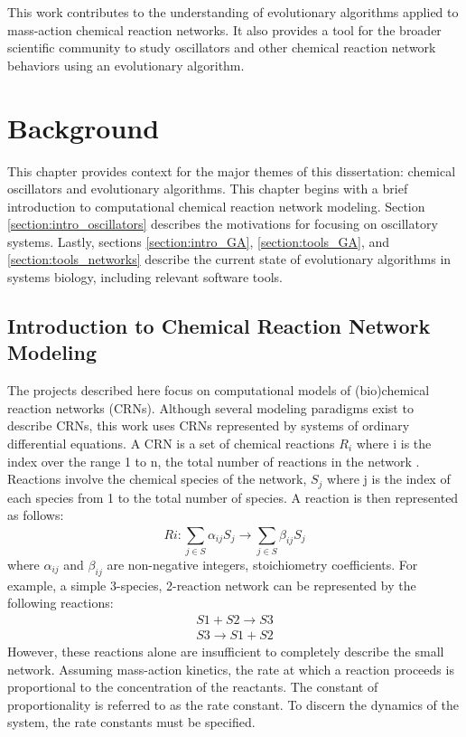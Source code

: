 \documentclass[12pt]{report}
\begin{document}
This work contributes to the understanding of evolutionary algorithms applied to mass-action chemical reaction networks. It also provides a tool for the broader scientific community to study oscillators and other chemical reaction network behaviors using an evolutionary algorithm.

\chapter{Background}

This chapter provides context for the major themes of this dissertation: chemical oscillators and evolutionary algorithms. This chapter begins with a brief introduction to computational chemical reaction network modeling. Section \ref{section:intro_oscillators} describes the motivations for focusing on oscillatory systems. Lastly, sections \ref{section:intro_GA}, \ref{section:tools_GA}, and \ref{section:tools_networks} describe the current state of evolutionary algorithms in systems biology, including relevant software tools.


\section{Introduction to Chemical Reaction Network Modeling}
\label{section:intro_crn}
The projects described here focus on computational models of (bio)chemical reaction networks (CRNs). Although several modeling paradigms exist to describe CRNs, this work uses CRNs represented by systems of ordinary differential equations. A CRN is a set of chemical reactions $R_i$ where i is the index over the range 1 to n, the total number of reactions in the network . Reactions involve the chemical species of the network, $S_j$ where j is the index of each species from 1 to the total number of species. A reaction is then represented as follows:
\begin{equation*}
Ri: \sum_{j\in S}^{}\alpha_{ij}S_j\to \sum_{j\in S}^{}\beta_{ij}S_j
\end{equation*}
where $\alpha_{ij}$ and $\beta_{ij}$ are non-negative integers, stoichiometry coefficients. For example, a simple 3-species, 2-reaction network can be represented by the following reactions:
\begin{equation}
\begin{split}
S1 + S2 \to S3 \\
S3 \to S1 + S2
\end{split}
\end{equation}
However, these reactions alone are insufficient to completely describe the small network.  Assuming mass-action kinetics, the rate at which a reaction proceeds is proportional to the concentration of the reactants. The constant of proportionality is referred to as the rate constant. To discern the dynamics of the system, the rate constants must be specified.
\end{document}
